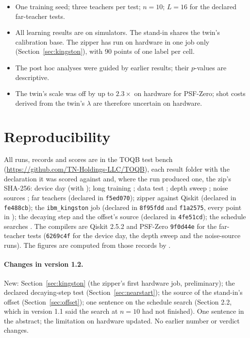 \documentclass[11pt]{article}
\begin{document}
\begin{itemize}
\item One training seed; three teachers per test; $n = 10$; $L = 16$ for the declared far-teacher tests.
\item All learning results are on simulators. The stand-in shares the twin's calibration base. The zipper has run on
hardware in one job only (Section~\ref{sec:kingston}), with 90 points of one label per cell.
\item The post hoc analyses were guided by earlier results; their $p$-values are descriptive.
\item The twin's scale was off by up to $2.3\times$ on hardware for PSF-Zero; shot costs derived from the twin's
$\lambda$ are therefore uncertain on hardware.
\end{itemize}

\section{Reproducibility}

All runs, records and scores are in the TOQB test bench (\url{https://github.com/TN-Holdings-LLC/TOQB}), each result folder with the declaration it was scored against and, where the run produced one, the zip's SHA-256: device day
 (with ); long training ;
data test ; depth sweep ; noise sources
; far teachers  (declared in
\texttt{f5ed070}); zipper against Qiskit  (declared in \texttt{fe488cb}); the
\texttt{ibm\_kingston} job  (declared in \texttt{8f95fdd} and \texttt{f1a2575}, every
point in ); the decaying step and the offset's source  (declared in
\texttt{4fe51cd}); the schedule searches . The
compilers are Qiskit 2.5.2 and PSF-Zero \texttt{9f0d44e} for the far-teacher tests (\texttt{6269c4f} for the device
day, the depth sweep and the noise-source runs). The figures are computed from those records by
.

\paragraph{Changes in version 1.2.} New: Section~\ref{sec:kingston} (the zipper's first hardware job, preliminary);
the declared decaying-step test (Section~\ref{sec:nearstart}); the source of the stand-in's offset
(Section~\ref{sec:offset}); one sentence on the schedule search (Section 2.2, which in version 1.1 said the search at
$n = 10$ had not finished). One sentence in the abstract; the limitation on hardware updated. No earlier number or
verdict changes.
\end{document}
